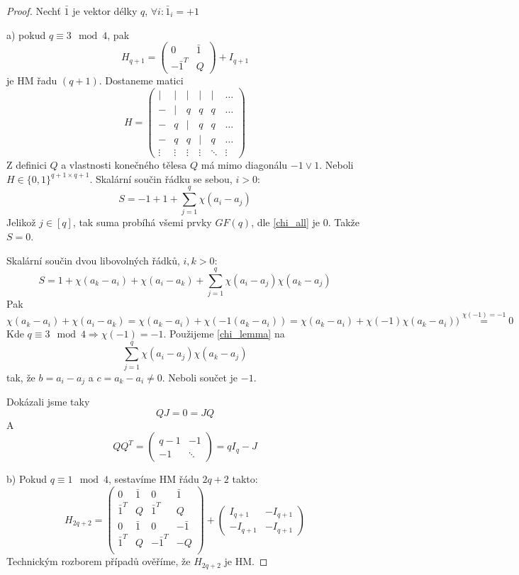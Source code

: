 \begin{proof}
	Nechť $\bar{1}$ je vektor délky $q$, $\forall i: \bar{1}_i = +1$

	a) pokud $q\equiv 3\mod 4$, pak
	\[ H_{q + 1} = \begin{pmatrix} 0 & \bar{1} \\ -\bar{1}^T & Q \end{pmatrix} + I_{q + 1} \]
	je HM řadu $(q + 1)$.
	Dostaneme matici
	\[ H = \begin{pmatrix}
		| & | & | & | & | & \ldots \\
		- & | & q & q & q & \ldots \\
		- & q & | & q & q & \ldots\\
		- & q & q & | & q & \ldots \\
		\vdots & \vdots & \vdots & \vdots & \ddots & \vdots
	      \end{pmatrix}
	\]
	Z definici $Q$ a vlastnosti konečného tělesa $Q$ má mimo diagonálu $-1 \lor 1$.
	Neboli $H \in \{ 0, 1 \}^{q + 1 \times q + 1}$.
	Skalární součin řádku se sebou, $i > 0$:
	\[ S = -1 + 1 + \sum_{j = 1}^q \chi(a_i - a_j) \]
	Jelikož $j \in [q]$, tak suma probíhá všemi prvky $GF(q)$, dle \eqref{chi_all} je 0.
	Takže $S = 0$.

	Skalární součin dvou libovolných řádků, $i, k > 0$:
	\[ S = 1 + \chi(a_k - a_i) + \chi(a_i - a_k) + \sum_{j = 1}^q \chi(a_i - a_j) \chi(a_k - a_j) \]
	Pak
	\[ \chi(a_k - a_i) + \chi(a_i - a_k) = \chi(a_k - a_i) + \chi(-1(a_k - a_i)) = \chi(a_k - a_i) + \chi(-1)\chi(a_k - a_i)) \stackrel{\chi(-1) = -1}{=} 0 \]
	Kde $q \equiv 3 \mod 4 \Rightarrow \chi(-1) = -1$.
	Použijeme \cref{chi_lemma} na
	\[ \sum_{j = 1}^q \chi(a_i - a_j) \chi(a_k - a_j) \]
	tak, že $b = a_i - a_j$ a $c = a_k - a_i \ne 0$.
	Neboli součet je $-1$.

	Dokázali jsme taky
	\[ QJ = 0 = JQ \]
	A
	\[ QQ^T = \begin{pmatrix} q - 1 & -1 \\ -1 & \ddots \end{pmatrix} = qI_q - J \]

	b) Pokud $q\equiv 1\mod 4$, sestavíme HM řádu $2q+2$ takto:
	\[ H_{2q + 2} = \begin{pmatrix}
		0 & \bar{1} & 0 & \bar{1} \\
		\bar{1}^T & Q & \bar{1}^T & Q \\
		0 & \bar{1} & 0 &- \bar{1} \\
		\bar{1}^T & Q & -\bar{1}^T & -Q \\
	      \end{pmatrix}
	+ \begin{pmatrix} I_{q + 1} & -I_{q + 1}\\ -I_{q + 1} & -I_{q + 1} \end{pmatrix}
	\]
	Technickým rozborem případů ověříme, že $H_{2q + 2}$ je HM.
\end{proof}

